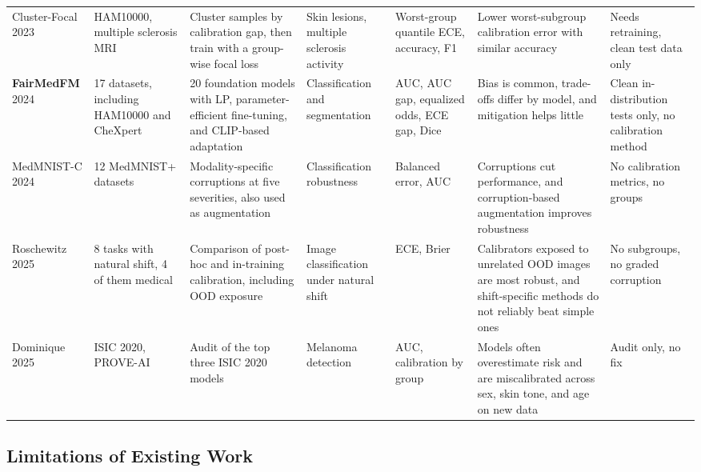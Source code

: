 \documentclass[sigconf,nonacm]{acmart}
\begin{document}
\begin{table}[t]
\begin{tabularx}{\textwidth}{@{}P{1.75cm}P{2.3cm}LP{1.9cm}P{1.85cm}LP{2.55cm}@{}}
    \addlinespace
    Cluster-Focal 2023 \cite{shui2023clusterfocal} & HAM10000, multiple sclerosis MRI & Cluster samples by calibration gap, then train with a group-wise focal loss & Skin lesions, multiple sclerosis activity & Worst-group quantile ECE, accuracy, F1 & Lower worst-subgroup calibration error with similar accuracy & Needs retraining, clean test data only \\
    \addlinespace
    \textbf{FairMedFM} 2024 \cite{jin2024fairmedfm} & 17 datasets, including HAM10000 and CheXpert & 20 foundation models with LP, parameter-efficient fine-tuning, and CLIP-based adaptation & Classification and segmentation & AUC, AUC gap, equalized odds, ECE gap, Dice & Bias is common, trade-offs differ by model, and mitigation helps little & Clean in-distribution tests only, no calibration method \\
    \addlinespace
    MedMNIST-C 2024 \cite{disalvo2024medmnistc} & 12 MedMNIST+ datasets & Modality-specific corruptions at five severities, also used as augmentation & Classification robustness & Balanced error, AUC & Corruptions cut performance, and corruption-based augmentation improves robustness & No calibration metrics, no groups \\
    \addlinespace
    Roschewitz 2025 \cite{roschewitz2025where} & 8 tasks with natural shift, 4 of them medical & Comparison of post-hoc and in-training calibration, including OOD exposure & Image classification under natural shift & ECE, Brier & Calibrators exposed to unrelated OOD images are most robust, and shift-specific methods do not reliably beat simple ones & No subgroups, no graded corruption \\
    \addlinespace
    Dominique 2025 \cite{dominique2025calibration} & ISIC 2020, PROVE-AI & Audit of the top three ISIC 2020 models & Melanoma detection & AUC, calibration by group & Models often overestimate risk and are miscalibrated across sex, skin tone, and age on new data & Audit only, no fix \\
    \bottomrule
  \end{tabularx}
\end{table}

\subsection{Limitations of Existing Work}
\end{document}
